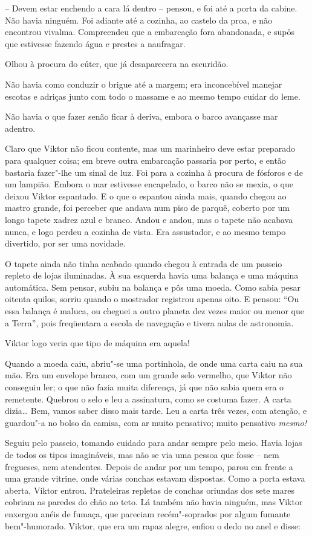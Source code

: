 -- Devem estar enchendo a cara lá dentro -- pensou, e foi até a porta da
cabine. Não havia ninguém. Foi adiante até a cozinha, ao castelo da
proa, e não encontrou vivalma. Compreendeu que a embarcação fora
abandonada, e supôs que estivesse fazendo água e prestes a naufragar.

Olhou à procura do cúter, que já desaparecera na escuridão. 

Não havia como conduzir o brigue até a margem; era inconcebível manejar
escotas e adriças junto com todo o massame e ao mesmo tempo cuidar do
leme. 

Não havia o que fazer senão ficar à deriva, embora o barco avançasse mar
adentro.

Claro que Viktor não ficou contente, mas um marinheiro deve estar
preparado para qualquer coisa; em breve outra embarcação passaria por
perto, e então bastaria fazer"-lhe um sinal de luz. Foi para a cozinha
à procura de fósforos e de um lampião. Embora o mar estivesse
encapelado, o barco não se mexia, o que deixou Viktor espantado. E o
que o espantou ainda mais, quando chegou ao mastro grande, foi perceber
que andava num piso de parquê, coberto por um longo tapete xadrez azul
e branco. Andou e andou, mas o tapete não acabava nunca, e logo perdeu
a cozinha de vista. Era assustador, e ao mesmo tempo divertido, por ser
uma novidade.

O tapete ainda não tinha acabado quando chegou à entrada de um passeio
repleto de lojas iluminadas. À sua esquerda havia uma balança e uma
máquina automática. Sem pensar, subiu na balança e pôs uma moeda. Como
sabia pesar oitenta quilos, sorriu quando o mostrador registrou apenas
oito. E pensou: ``Ou essa balança é maluca, ou cheguei a outro planeta
dez vezes maior ou menor que a Terra'', pois freqüentara a escola de
navegação e tivera aulas de astronomia.

Viktor logo veria que tipo de máquina era aquela! 

Quando a moeda caiu, abriu"-se uma portinhola, de onde uma carta caiu
na sua mão. Era um envelope branco, com um grande selo vermelho, que
Viktor não conseguiu ler; o que não fazia muita diferença, já que não
sabia quem era o remetente. Quebrou o selo e leu a assinatura, como se
costuma fazer. A carta dizia\ldots{} Bem, vamos saber disso mais tarde. Leu
a carta três vezes, com atenção, e guardou"-a no bolso da camisa, com
ar muito pensativo; muito pensativo \textit{mesmo!}

Seguiu pelo passeio, tomando cuidado para andar sempre pelo meio. Havia
lojas de todos os tipos imagináveis, mas não se via uma pessoa que
fosse -- nem fregueses, nem atendentes. Depois de andar por um tempo,
parou em frente a uma grande vitrine, onde várias conchas estavam
dispostas. Como a porta estava aberta, Viktor entrou. Prateleiras
repletas de conchas oriundas dos sete mares cobriam as paredes do chão
ao teto. Lá também não havia ninguém, mas Viktor enxergou anéis de
fumaça, que pareciam recém"-soprados por algum fumante bem"-humorado.
Viktor, que era um rapaz alegre, enfiou o dedo no anel e disse:

